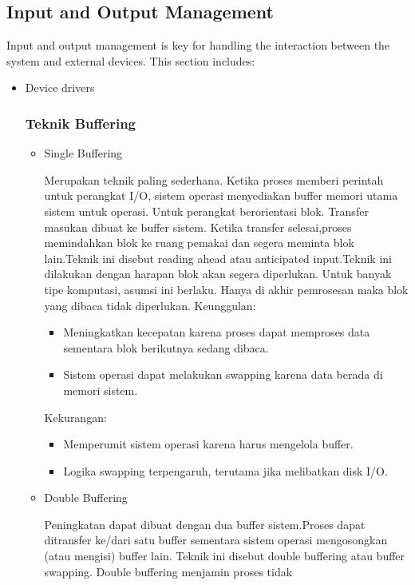 \documentclass[12pt]{article}
\begin{document}
\subsection{Input and Output Management}
Input and output management is key for handling the interaction between the system and external devices. This section includes:
\begin{itemize}
    \item Device drivers
    \subsubsection{Teknik Buffering}
    \begin{itemize}
        \item Single Buffering
        \par Merupakan teknik paling sederhana. Ketika proses memberi perintah untuk perangkat
 I/O, sistem operasi menyediakan buffer memori utama sistem untuk operasi. Untuk
 perangkat berorientasi blok. Transfer masukan dibuat ke buffer sistem. Ketika transfer
 selesai,proses memindahkan blok ke ruang pemakai dan segera meminta blok lain.Teknik
 ini disebut reading ahead atau anticipated input.Teknik ini dilakukan dengan harapan
 blok akan segera diperlukan. Untuk banyak tipe komputasi, asumsi ini berlaku. Hanya
 di akhir pemrosesan maka blok yang dibaca tidak diperlukan.
 \newline Keunggulan:
    \begin{itemize}
        \item  Meningkatkan kecepatan karena proses
 dapat memproses data sementara blok
 berikutnya sedang dibaca.
 \item Sistem operasi dapat melakukan swapping
 karena data berada di memori sistem.
    \end{itemize}
    \newline Kekurangan:
    \begin{itemize}
        \item Memperumit sistem operasi karena harus
        mengelola buffer.
        \item Logika swapping terpengaruh, terutama jika
        melibatkan disk I/O.
    \end{itemize}
    \item Double Buffering
    \par Peningkatan dapat dibuat dengan dua buffer sistem.Proses dapat ditransfer ke/dari satu
    buffer sementara sistem operasi mengosongkan (atau mengisi) buffer lain. Teknik ini
    disebut double buffering atau buffer swapping. Double buffering menjamin proses tidak

\end{itemize}
\end{itemize}
\end{document}

